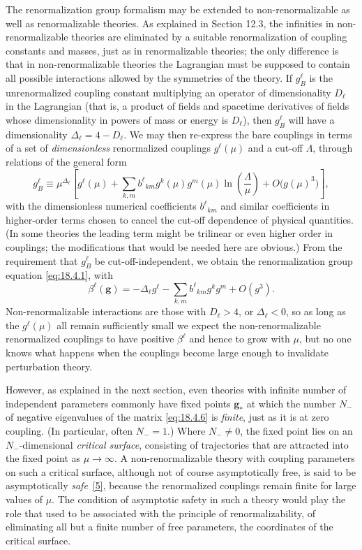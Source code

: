 The renormalization group formalism may be extended to non-renormalizable as well as renormalizable theories. As explained in Section 12.3, the infinities in non-renormalizable theories are eliminated by a suitable renormalization of coupling constants and masses, just as in renormalizable theories; the only difference is that in non-renormalizable theories the Lagrangian must be supposed to contain all possible interactions allowed by the symmetries of the theory. If $g_B^\ell$ is the unrenormalized coupling constant multiplying an operator of dimensionality $D_\ell$ in the Lagrangian (that is, a product of fields and spacetime derivatives of fields whose dimensionality in powers of mass or energy is $D_\ell$), then $g_B^\ell$ will have a dimensionality $\Delta_\ell=4-D_\ell$. We may then re-express the bare couplings in terms of a set of \emph{dimensionless} renormalized couplings $g^\ell(\mu)$ and a cut-off $\Lambda$, through relations of the general form
\begin{equation}
g_B^\ell\equiv\mu^{\Delta_\ell}
\left[g^\ell(\mu)+\sum_{k,m}b^\ell{}_{km}g^k(\mu)g^m(\mu)\ln\left(\frac{\Lambda}{\mu}\right)
+O\bigl(g(\mu)^3\bigr)\right],
\tag{18.4.11}\label{eq:18.4.11}
\end{equation}
with the dimensionless numerical coefficients $b^\ell{}_{km}$ and similar coefficients in higher-order terms chosen to cancel the cut-off dependence of physical quantities. (In some theories the leading term might be trilinear or even higher order in couplings; the modifications that would be needed here are obvious.) From the requirement that $g_B^\ell$ be cut-off-independent, we obtain the renormalization group equation \eqref{eq:18.4.1}, with
\begin{equation}
\beta^\ell(\mathbf{g})=-\Delta_\ell g^\ell-\sum_{k,m}b^\ell{}_{km}g^k g^m+O(g^3).
\tag{18.4.12}\label{eq:18.4.12}
\end{equation}
Non-renormalizable interactions are those with $D_\ell>4$, or $\Delta_\ell<0$, so as long as the $g^\ell(\mu)$ all remain sufficiently small we expect the non-renormalizable renormalized couplings to have positive $\beta^\ell$ and hence to grow with $\mu$, but no one knows what happens when the couplings become large enough to invalidate perturbation theory.

However, as explained in the next section, even theories with infinite number of independent parameters commonly have fixed points $\mathbf{g}_*$ at which the number $N_-$ of negative eigenvalues of the matrix \eqref{eq:18.4.6} is \emph{finite}, just as it is at zero coupling. (In particular, often $N_-=1$.) Where $N_-\ne0$, the fixed point lies on an $N_-$-dimensional \emph{critical surface}, consisting of trajectories that are attracted into the fixed point as $\mu\to\infty$. A non-renormalizable theory with coupling parameters on such a critical surface, although not of course asymptotically free, is said to be asymptotically \emph{safe}~\hyperref[ch18-ref-5]{[5]}, because the renormalized couplings remain finite for large values of $\mu$. The condition of asymptotic safety in such a theory would play the role that used to be associated with the principle of renormalizability, of eliminating all but a finite number of free parameters, the coordinates of the critical surface.

